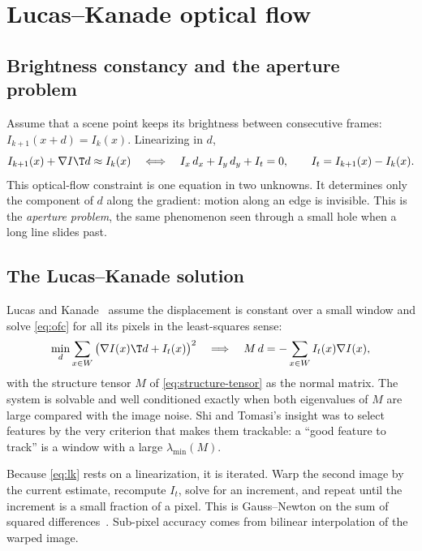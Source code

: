 \section{Lucas--Kanade optical flow}

\subsection{Brightness constancy and the aperture problem}

Assume that a scene point keeps its brightness between consecutive frames:
$I_{k+1}(x + d) = I_k(x)$. Linearizing in $d$,
\begin{equation}
  I_{k+1}(x) + \nabla I\T d \approx I_k(x)
  \quad\Longleftrightarrow\quad
  I_x\,d_x + I_y\,d_y + I_t = 0, \qquad I_t = I_{k+1}(x) - I_k(x).
  \label{eq:ofc}
\end{equation}
This optical-flow constraint is one equation in two unknowns. It determines only the component of $d$ along the
gradient: motion along an edge is invisible. This is the \emph{aperture problem}, the same phenomenon seen through a
small hole when a long line slides past.

\subsection{The Lucas--Kanade solution}

Lucas and Kanade~\cite{lucas1981iterative} assume the displacement is constant over a small window and solve
\eqref{eq:ofc} for all its pixels in the least-squares sense:
\begin{equation}
  \min_d \sum_{x\in W}\big(\nabla I(x)\T d + I_t(x)\big)^2
  \quad\Longrightarrow\quad
  M\,d = -\sum_{x\in W} I_t(x)\nabla I(x),
  \label{eq:lk}
\end{equation}
with the structure tensor $M$ of \eqref{eq:structure-tensor} as the normal matrix. The system is solvable and well
conditioned exactly when both eigenvalues of $M$ are large compared with the image noise. Shi and Tomasi's insight
was to select features by the very criterion that makes them trackable: a ``good feature to track'' is a window
with a large $\lambda_{\min}(M)$.

Because \eqref{eq:lk} rests on a linearization, it is iterated. Warp the second image by the current estimate, recompute
$I_t$, solve for an increment, and repeat until the increment is a small fraction of a pixel. This is Gauss--Newton on
the sum of squared differences~\cite{baker2004lk}. Sub-pixel accuracy comes from bilinear interpolation of the
warped image.

